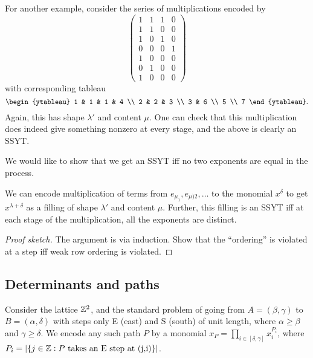 \begin{fex}
		For another example, consider the series of multiplications encoded by
		\[
		\begin{pmatrix}
			1 & 1 & 1 & 0 \\
			1 & 1 & 0 & 0 \\
			1 & 0 & 1 & 0 \\
			0 & 0 & 0 & 1 \\
			1 & 0 & 0 & 0 \\
			0 & 1 & 0 & 0 \\
			1 & 0 & 0 & 0
		\end{pmatrix}
		\]
		with corresponding tableau
		\[
		\begin{ytableau}
			1 & 1 & 1 & 4 \\ 2 & 2 & 3 \\ 3 & 6 \\ 5 \\ 7
		\end{ytableau}.
		\]
		Again, this has shape $\lambda'$ and content $\mu$. One can check that this multiplication does indeed give something nonzero at every stage, and the above is clearly an SSYT.
	\end{fex}

	We would like to show that we get an SSYT iff no two exponents are equal in the process.

	\begin{flem}
		We can encode multiplication of terms from $e_{\mu_1},e_{\mu)2},\ldots$ to the monomial $x^\delta$ to get $x^{\lambda+\delta}$ as a filling of shape $\lambda'$ and content $\mu$. Further, this filling is an SSYT iff at each stage of the multiplication, all the exponents are distinct.
	\end{flem}
	\begin{proof}[Proof sketch]
		The argument is via induction. Show that the ``ordering'' is violated at a step iff weak row ordering is violated.
	\end{proof}

\subsection{Determinants and paths}

	Consider the lattice $\mathbb{Z}^2$, and the standard problem of going from $A = (\beta,\gamma)$ to $B = (\alpha,\delta)$ with steps only E (east) and S (south) of unit length, where $\alpha \ge \beta$ and $\gamma \ge \delta$. We encode any such path $P$ by a monomial $x_P = \prod_{i \in [\delta,\gamma]} x_i^{P_i}$, where $P_i = |\{ j \in \mathbb{Z} : \text{$P$ takes an E step at (j,i)} \}|$.\\

